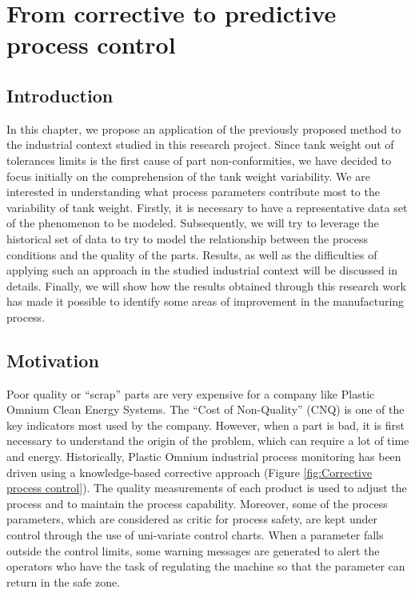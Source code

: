 \chapter{From corrective to predictive process control} \label{From Corrective to Predictive Process Control}
\minitoc

\section{Introduction}

In this chapter, we propose an application of the previously proposed method to the industrial context studied in this research project. Since tank weight out of tolerances limits is the first cause of part non-conformities, we have decided to focus initially on the comprehension of the tank weight variability. We are interested in understanding what process parameters contribute most to the variability of tank weight. Firstly, it is necessary to have a representative data set of the phenomenon to be modeled. Subsequently, we will try to leverage the historical set of data to try to model the relationship between the process conditions and the quality of the parts. Results, as well as the difficulties of applying such an approach in the studied industrial context will be discussed in details. Finally, we will show how the results obtained through this research work has made it possible to identify some areas of improvement in the manufacturing process. 


\section{Motivation}

Poor quality or ``scrap'' parts are very expensive for a company like Plastic Omnium Clean Energy Systems. The “Cost of Non-Quality” (CNQ) is one of the key indicators most used by the company. However, when a part is bad, it is first necessary to understand the origin of the problem, which can require a lot of time and energy. Historically, Plastic Omnium industrial process monitoring has been driven using a knowledge-based corrective approach (Figure \ref{fig:Corrective process control}). The quality measurements of each product is used to adjust the process and to maintain the process capability. Moreover, some of the process parameters, which are considered as critic for process safety, are kept under control through the use of uni-variate control charts.  When a parameter falls outside the control limits, some warning messages are generated to alert the operators who have the task of regulating the machine so that the parameter can return in the safe zone. 


